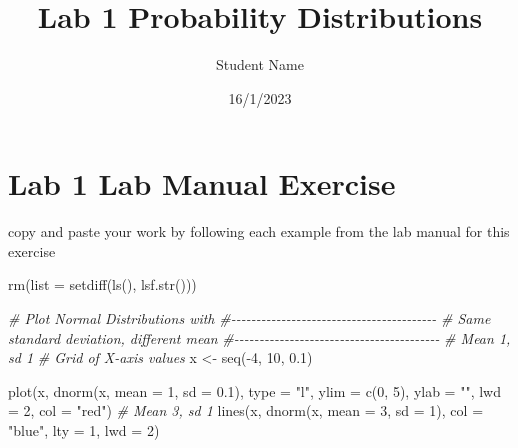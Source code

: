 \documentclass[
]{article}
\title{Lab 1 Probability Distributions}
\author{Student Name}
\date{16/1/2023}
\newenvironment{Shaded}{\begin{snugshade}}{\end{snugshade}}
\newcommand{\AttributeTok}[1]{\textcolor[rgb]{0.77,0.63,0.00}{#1}}
\newcommand{\CommentTok}[1]{\textcolor[rgb]{0.56,0.35,0.01}{\textit{#1}}}
\newcommand{\DecValTok}[1]{\textcolor[rgb]{0.00,0.00,0.81}{#1}}
\newcommand{\FloatTok}[1]{\textcolor[rgb]{0.00,0.00,0.81}{#1}}
\newcommand{\FunctionTok}[1]{\textcolor[rgb]{0.00,0.00,0.00}{#1}}
\newcommand{\NormalTok}[1]{#1}
\newcommand{\OtherTok}[1]{\textcolor[rgb]{0.56,0.35,0.01}{#1}}
\newcommand{\SpecialCharTok}[1]{\textcolor[rgb]{0.00,0.00,0.00}{#1}}
\newcommand{\StringTok}[1]{\textcolor[rgb]{0.31,0.60,0.02}{#1}}
\begin{document}
\maketitle

{
\setcounter{tocdepth}{2}
\tableofcontents
}
\hypertarget{lab-1-lab-manual-exercise}{%
\section{Lab 1 Lab Manual Exercise}\label{lab-1-lab-manual-exercise}}

copy and paste your work by following each example from the lab manual
for this exercise

\begin{Shaded}
\begin{Highlighting}[]
\FunctionTok{rm}\NormalTok{(}\AttributeTok{list =} \FunctionTok{setdiff}\NormalTok{(}\FunctionTok{ls}\NormalTok{(), }\FunctionTok{lsf.str}\NormalTok{()))}

\CommentTok{\# Plot Normal Distributions with }
\CommentTok{\#{-}{-}{-}{-}{-}{-}{-}{-}{-}{-}{-}{-}{-}{-}{-}{-}{-}{-}{-}{-}{-}{-}{-}{-}{-}{-}{-}{-}{-}{-}{-}{-}{-}{-}{-}{-}{-}{-}{-}{-}{-}}
\CommentTok{\# Same standard deviation, different mean}
\CommentTok{\#{-}{-}{-}{-}{-}{-}{-}{-}{-}{-}{-}{-}{-}{-}{-}{-}{-}{-}{-}{-}{-}{-}{-}{-}{-}{-}{-}{-}{-}{-}{-}{-}{-}{-}{-}{-}{-}{-}{-}{-}{-}}
\CommentTok{\# Mean 1, sd 1}
\CommentTok{\# Grid of X{-}axis values}
\NormalTok{x }\OtherTok{\textless{}{-}} \FunctionTok{seq}\NormalTok{(}\SpecialCharTok{{-}}\DecValTok{4}\NormalTok{, }\DecValTok{10}\NormalTok{, }\FloatTok{0.1}\NormalTok{)}

\FunctionTok{plot}\NormalTok{(x, }\FunctionTok{dnorm}\NormalTok{(x, }\AttributeTok{mean =} \DecValTok{1}\NormalTok{, }\AttributeTok{sd =} \FloatTok{0.1}\NormalTok{), }\AttributeTok{type =} \StringTok{"l"}\NormalTok{,}
     \AttributeTok{ylim =} \FunctionTok{c}\NormalTok{(}\DecValTok{0}\NormalTok{, }\DecValTok{5}\NormalTok{), }\AttributeTok{ylab =} \StringTok{""}\NormalTok{, }\AttributeTok{lwd =} \DecValTok{2}\NormalTok{, }\AttributeTok{col =} \StringTok{"red"}\NormalTok{)}
\CommentTok{\# Mean 3, sd 1}
\FunctionTok{lines}\NormalTok{(x, }\FunctionTok{dnorm}\NormalTok{(x, }\AttributeTok{mean =} \DecValTok{3}\NormalTok{, }\AttributeTok{sd =} \DecValTok{1}\NormalTok{), }\AttributeTok{col =} \StringTok{"blue"}\NormalTok{, }\AttributeTok{lty =} \DecValTok{1}\NormalTok{, }\AttributeTok{lwd =} \DecValTok{2}\NormalTok{)}
\end{Highlighting}
\end{Shaded}
\end{document}
